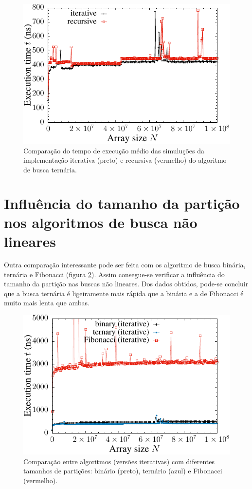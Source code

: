 \begin{figure}[H]
  \centering
  \includegraphics[scale=1.2]{../plots/tsearch_itvsrec_time.pdf}
  \caption{Comparação do tempo de execução médio das simuluções da implementação iterativa (preto) e recursiva (vermelho) do algoritmo de busca ternária.}
  \label{fig:tsearch_ivsr_time}
\end{figure} 


\section{Influência do tamanho da partição nos algoritmos de busca não lineares}

Outra comparação interessante pode ser feita com os algoritmo de busca binária, ternária e Fibonacci (figura \ref{fig:bvstvsfib_search_time}). Assim consegue-se verificar a influência do tamanho da partição nas buscas não lineares. Dos dados obtidos, pode-se concluir que a busca ternária é ligeiramente mais rápida que a binária e a de Fibonacci é muito mais lenta que ambas.

\begin{figure}[H]
  \centering
  \includegraphics[scale=1.2]{../plots/bvstvsfib_search_time.pdf}
  \caption{Comparação entre algoritmos (versões iterativas) com diferentes tamanhos de partições: binário (preto), ternário (azul) e Fibonacci (vermelho).}
  \label{fig:bvstvsfib_search_time}
\end{figure} 


